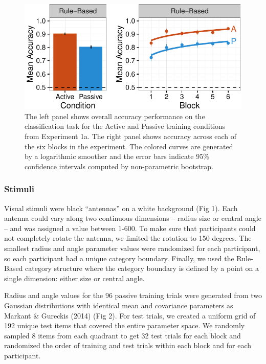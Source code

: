 \documentclass[10pt, letterpaper]{article}
\newenvironment{CodeChunk}{}{}
\begin{document}
\begin{CodeChunk}
\begin{figure}[t]

{\centering \includegraphics{figs/exp1a_acc_plot-1} 

}

\caption[The left panel shows overall accuracy performance on the classification task for the Active and Passive training conditions from Experiment 1a]{The left panel shows overall accuracy performance on the classification task for the Active and Passive training conditions from Experiment 1a. The right panel shows accuracy across each of the six blocks in the experiment. The colored curves are generated by a logarithmic smoother and the error bars indicate 95\% confidence intervals computed by non-parametric bootstrap.}\label{fig:exp1a_acc_plot}
\end{figure}
\end{CodeChunk}

\subsubsection{Stimuli}\label{stimuli}

Visual stimuli were black ``antennas'' on a white background (Fig 1).
Each antenna could vary along two continuous dimensions -- radius size
or central angle -- and was assigned a value between 1-600. To make sure
that participants could not completely rotate the antenna, we limited
the rotation to 150 degrees. The smallest radius and angle parameter
values were randomized for each participant, so each participant had a
unique category boundary. Finally, we used the Rule-Based category
structure where the category boundary is defined by a point on a single
dimension: either size or central angle.

Radius and angle values for the 96 passive training trials were
generated from two Gaussian distributions with identical mean and
covariance parameters as Markant \& Gureckis (2014) (Fig 2). For test
trials, we created a uniform grid of 192 unique test items that covered
the entire parameter space. We randomly sampled 8 items from each
quadrant to get 32 test trials for each block and randomized the order
of training and test trials within each block and for each participant.
\end{document}
